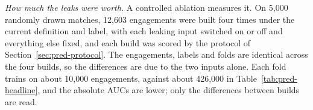 \emph{How much the leaks were worth.} A controlled ablation measures it. On 5,000 randomly drawn matches,
12,603 engagements were built four times under the current definition and label, with each leaking input
switched on or off and everything else fixed, and each build was scored by the protocol of
Section~\ref{sec:pred-protocol}. The engagements, labels and folds are identical across the four builds,
so the differences are due to the two inputs alone. Each fold trains on about 10,000 engagements, against
about 426,000 in Table~\ref{tab:pred-headline}, and the absolute AUCs are lower; only the differences
between builds are read.

